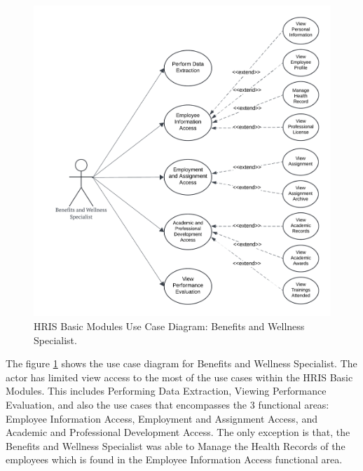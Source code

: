     \begin{figure}[H]
        \centering
        \includegraphics[width=0.9\linewidth]{figures/images/use-case-basic-6.png}
        \caption{HRIS Basic Modules Use Case Diagram: Benefits and Wellness Specialist.}
        \label{fig:use-case-basic-6}
    \end{figure}

    The figure \ref{fig:use-case-basic-6} shows the use case diagram for Benefits and Wellness Specialist. The actor has limited view access to the most of the use cases within the HRIS Basic Modules. This includes Performing Data Extraction, Viewing Performance Evaluation, and also the use cases that  encompasses the 3 functional areas: Employee Information Access, Employment and Assignment Access, and Academic and Professional Development Access. The only exception is that, the Benefits and Wellness Specialist was able to Manage the Health Records of the employees which is found in the Employee Information Access functional area.

